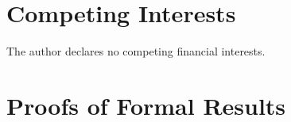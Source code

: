 \documentclass[3p]{elsarticle}
\begin{document}
\section*{Competing Interests}

The author declares no competing financial interests.




\appendix

\section{Proofs of Formal Results}\label{sec:proofs}
\end{document}
